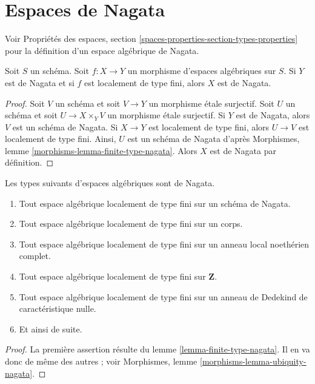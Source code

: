 \section{Espaces de Nagata}
\label{section-nagata}

\noindent
Voir Propriétés des espaces, section
\ref{spaces-properties-section-types-properties} pour la définition
d'un espace algébrique de Nagata.

\begin{lemma}
\label{lemma-finite-type-nagata}
Soit $S$ un schéma.
Soit $f : X \to Y$ un morphisme d'espaces algébriques sur $S$.
Si $Y$ est de Nagata et si $f$ est localement de type fini, alors $X$ est de Nagata.
\end{lemma}

\begin{proof}
Soit $V$ un schéma et soit $V \to Y$ un morphisme étale surjectif.
Soit $U$ un schéma et soit $U \to X \times_Y V$ un morphisme étale
surjectif. Si $Y$ est de Nagata, alors $V$ est un schéma de Nagata.
Si $X \to Y$ est localement de type fini, alors $U \to V$ est localement
de type fini. Ainsi, $U$ est un schéma de Nagata d'après
Morphismes, lemme \ref{morphisms-lemma-finite-type-nagata}.
Alors $X$ est de Nagata par définition.
\end{proof}

\begin{lemma}
\label{lemma-ubiquity-nagata}
Les types suivants d'espaces algébriques sont de Nagata.
\begin{enumerate}
\item Tout espace algébrique localement de type fini sur un schéma de Nagata.
\item Tout espace algébrique localement de type fini sur un corps.
\item Tout espace algébrique localement de type fini sur un
anneau local noethérien complet.
\item Tout espace algébrique localement de type fini sur $\mathbf{Z}$.
\item Tout espace algébrique localement de type fini sur un anneau de Dedekind de
caractéristique nulle.
\item Et ainsi de suite.
\end{enumerate}
\end{lemma}

\begin{proof}
La première assertion résulte du lemme \ref{lemma-finite-type-nagata}.
Il en va donc de même des autres ; voir
Morphismes, lemme \ref{morphisms-lemma-ubiquity-nagata}.
\end{proof}








